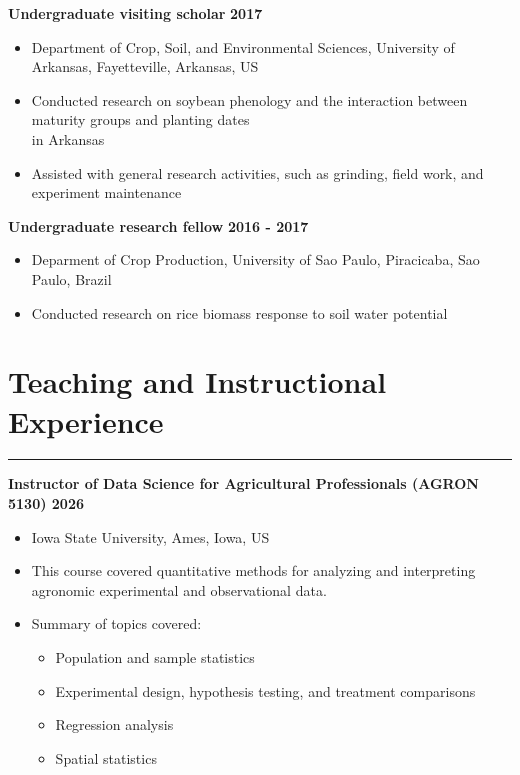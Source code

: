 \documentclass[letterpaper,10pt]{article}
\begin{document}

{\bf Undergraduate visiting scholar }\hfill {\bf 2017}
\vspace{-.1in}
\begin{itemize}
\renewcommand\labelitemi{{\boldmath$\cdot$}}
\itemsep-0.5em
\item 
Department of Crop, Soil, and Environmental
Sciences,
University of Arkansas, 
Fayetteville, Arkansas, US

\item Conducted research on soybean phenology and
	the interaction between maturity groups and planting
	dates\\in Arkansas
\item Assisted with general research activities,
	such as grinding, field work, and
	experiment maintenance


\end{itemize}

{\bf Undergraduate research fellow  }\hfill {\bf 2016 - 2017}
\vspace{-.1in}
\begin{itemize}
\renewcommand\labelitemi{{\boldmath$\cdot$}}
\itemsep-0.5em
\item 
Deparment of Crop Production, 
University of Sao Paulo,
Piracicaba, Sao Paulo, Brazil

\item Conducted research on rice biomass response
	to soil water potential 
\end{itemize}




\section*{\sc Teaching and Instructional Experience}
\hrule
\vspace{.1in}

{\bf Instructor of Data Science for Agricultural
Professionals (AGRON 5130)  \hfill  2026}
\vspace{-.1in}
\begin{itemize}
\itemsep-0.5em
\renewcommand\labelitemi{{\boldmath$\cdot$}}
\item  Iowa State University, Ames, Iowa, US
\item This course covered quantitative methods for
	analyzing and interpreting agronomic
	experimental and observational data.
\item Summary of topics covered:
\vspace{-.1in}
\begin{itemize}	
\itemsep-0.2em
\item Population and sample statistics
\item Experimental design, hypothesis testing, and
	treatment comparisons
\item Regression analysis
\item Spatial statistics
\end{itemize}
\end{itemize}
\end{document}
